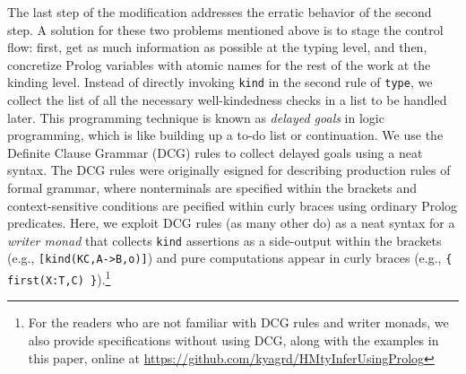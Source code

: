 \documentclass[runningheads,a4paper]{llncs}
\begin{document}
The last step of the modification addresses the erratic behavior of
the second step. A solution for these two problems mentioned above is
to stage the control flow: first, get as much information as possible
at the typing level, and then, concretize Prolog variables with atomic names
for the rest of the work at the kinding level. Instead of directly invoking
\verb|kind| in the second rule of \verb|type|, we collect the list of
all the necessary well-kindedness checks in a list to be handled later.
This programming technique is known as \emph{delayed goals}
in logic programming, which is like building up a to-do list or continuation.
We use the Definite Clause Grammar (DCG) rules \cite{SWIPrologManual}
to collect delayed goals using a neat syntax. The DCG rules were originally
esigned for describing production rules of formal grammar, where nonterminals
are specified within the brackets and context-sensitive conditions are
pecified within curly braces using ordinary Prolog predicates. Here,
we exploit DCG rules (as many other do) as a neat syntax for
a \emph{writer monad} that collects \texttt{kind} assertions
as a side-output within the brackets (e.g., \verb|[kind(KC,A->B,o)]|) and pure
computations appear in curly braces (e.g., \verb|{ first(X:T,C) }|).\footnote{
  For the readers who are not familiar with DCG rules and writer monads,
  we also provide specifications without using DCG, along with the examples
  in this paper, online at \url{https://github.com/kyagrd/HMtyInferUsingProlog} }
\end{document}
